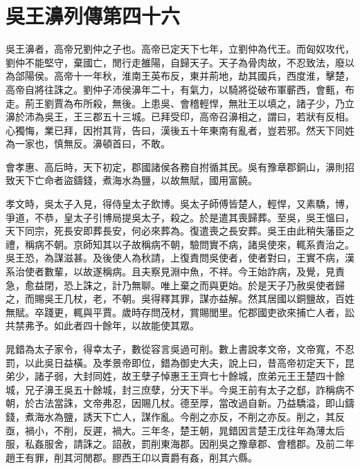 \chapter{吳王濞列傳第四十六}

吳王濞者，高帝兄劉仲之子也。高帝已定天下七年，立劉仲為代王。而匈奴攻代，劉仲不能堅守，棄國亡，閒行走雒陽，自歸天子。天子為骨肉故，不忍致法，廢以為郃陽侯。高帝十一年秋，淮南王英布反，東并荊地，劫其國兵，西度淮，擊楚，高帝自將往誅之。劉仲子沛侯濞年二十，有氣力，以騎將從破布軍蘄西，會甀，布走。荊王劉賈為布所殺，無後。上患吳、會稽輕悍，無壯王以填之，諸子少，乃立濞於沛為吳王，王三郡五十三城。已拜受印，高帝召濞相之，謂曰，若狀有反相。心獨悔，業已拜，因拊其背，告曰，漢後五十年東南有亂者，豈若邪。然天下同姓為一家也，慎無反。濞頓首曰，不敢。

會孝惠、高后時，天下初定，郡國諸侯各務自拊循其民。吳有豫章郡銅山，濞則招致天下亡命者盜鑄錢，煮海水為鹽，以故無賦，國用富饒。

孝文時，吳太子入見，得侍皇太子飲博。吳太子師傅皆楚人，輕悍，又素驕，博，爭道，不恭，皇太子引博局提吳太子，殺之。於是遣其喪歸葬。至吳，吳王慍曰，天下同宗，死長安即葬長安，何必來葬為。復遣喪之長安葬。吳王由此稍失藩臣之禮，稱病不朝。京師知其以子故稱病不朝，驗問實不病，諸吳使來，輒系責治之。吳王恐，為謀滋甚。及後使人為秋請，上復責問吳使者，使者對曰，王實不病，漢系治使者數輩，以故遂稱病。且夫察見淵中魚，不祥。今王始詐病，及覺，見責急，愈益閉，恐上誅之，計乃無聊。唯上棄之而與更始。於是天子乃赦吳使者歸之，而賜吳王几杖，老，不朝。吳得釋其罪，謀亦益解。然其居國以銅鹽故，百姓無賦。卒踐更，輒與平賈。歲時存問茂材，賞賜閭里。佗郡國吏欲來捕亡人者，訟共禁弗予。如此者四十餘年，以故能使其眾。

晁錯為太子家令，得幸太子，數從容言吳過可削。數上書說孝文帝，文帝寬，不忍罰，以此吳日益橫。及孝景帝即位，錯為御史大夫，說上曰，昔高帝初定天下，昆弟少，諸子弱，大封同姓，故王孽子悼惠王王齊七十餘城，庶弟元王王楚四十餘城，兄子濞王吳五十餘城，封三庶孽，分天下半。今吳王前有太子之郄，詐稱病不朝，於古法當誅，文帝弗忍，因賜几杖。德至厚，當改過自新。乃益驕溢，即山鑄錢，煮海水為鹽，誘天下亡人，謀作亂。今削之亦反，不削之亦反。削之，其反亟，禍小，不削，反遲，禍大。三年冬，楚王朝，晁錯因言楚王戊往年為薄太后服，私姦服舍，請誅之。詔赦，罰削東海郡。因削吳之豫章郡、會稽郡。及前二年趙王有罪，削其河閒郡。膠西王卬以賣爵有姦，削其六縣。

